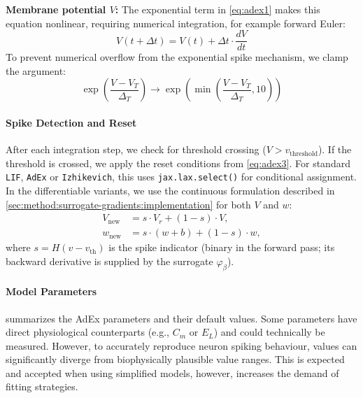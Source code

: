 \textbf{Membrane potential $V$:}
The exponential term in \cref{eq:adex1} makes this equation nonlinear, requiring numerical integration, for example forward Euler:
\begin{equation}
    V(t + \Delta t) = V(t) + \Delta t \cdot \frac{dV}{dt}
\end{equation}
To prevent numerical overflow from the exponential spike mechanism, we clamp the argument:
\begin{equation}
    \exp\left(\frac{V - V_T}{\Delta_T}\right) \rightarrow \exp\left(\min\left(\frac{V - V_T}{\Delta_T}, 10\right)\right)
\end{equation}

\paragraph{Spike Detection and Reset}\label{sec:method:adex:spike-detection}
After each integration step, we check for threshold crossing ($V > v_{\text{threshold}}$).
If the threshold is crossed, we apply the reset conditions from \cref{eq:adex3}.
For standard \texttt{LIF}, \texttt{AdEx} or \texttt{Izhikevich}, this uses \texttt{jax.lax.select()} for conditional assignment.
In the differentiable variants, we use the continuous formulation described in \cref{sec:method:surrogate-gradients:implementation} for both $V$ and $w$:
\begin{align}
    V_{\text{new}} &= s \cdot V_r + (1 - s) \cdot V, \\
    w_{\text{new}} &= s \cdot (w + b) + (1 - s) \cdot w,
\end{align}
where $s = H(v - v_{\text{th}})$ is the spike indicator (binary in the forward pass; its backward derivative is supplied by the surrogate $\varphi_\beta$).

\paragraph{Model Parameters}\label{sec:method:adex:default-parameters}
 summarizes the \gls{AdEx} parameters and their default values.
Some parameters have direct physiological counterparts (e.g., $C_m$ or $E_L$) and could technically be measured.
However, to accurately reproduce neuron spiking behaviour, values can significantly diverge from biophysically plausible value ranges.
This is expected and accepted when using simplified models, however, increases the demand of fitting strategies.

